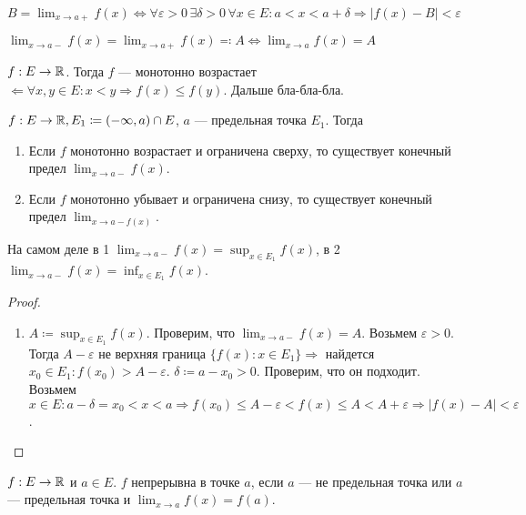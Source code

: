 \begin{remark}
    $B = \lim_{x \to a+} f(x) \iff \forall \varepsilon > 0 \, \exists \delta > 0 \, \forall x \in E: a < x < a + \delta \Rightarrow |f(x) - B| < \varepsilon$
\end{remark}
\begin{remark}
    $\lim_{x\to a-} f(x) = \lim_{x \to a+} f(x) \eqqcolon A \iff \lim_{x \to a} f(x) = A$
\end{remark}
\begin{definition}
    $f: E \to \mathbb{R}$. Тогда  $f$ --- монотонно возрастает $\Leftarrow \forall x, y \in E: x < y \Rightarrow f(x) \le f(y)$.
    Дальше бла-бла-бла.
\end{definition}
\begin{theorem}
    $f: E \to \mathbb{R}, E_1 \coloneqq (-\infty, a) \cap E$,  $a$ --- предельная точка  $E_1$. Тогда
     \begin{enumerate}
         \item Если $f$ монотонно возрастает и ограничена сверху, то существует конечный предел  $\lim_{x \to a-} f(x)$.
         \item Если $f$ монотонно убывает и ограничена снизу, то существует конечный предел  $\lim_{x \to a- f(x)}$.
    \end{enumerate}
\end{theorem}
\begin{remark}
    На самом деле в 1  $\lim_{x \to a-} f(x) = \sup_{x \in E_1} f(x)$, в  2  $\lim_{x \to a-} f(x) = \inf_{x \in E_1} f(x)$.
\end{remark}
\begin{proof}
    \slashn
    \begin{enumerate}
        \item $A \coloneqq \sup_{x \in E_1} f(x)$. Проверим, что  $\lim_{x \to a-} f(x) = A$. Возьмем  $\varepsilon > 0$. Тогда  $A - \varepsilon$ не верхняя граница $\{f(x): x \in E_1\} \Rightarrow$ найдется $x_0 \in E_1: f(x_0) > A - \varepsilon$. $\delta \coloneqq a - x_0 > 0$. Проверим, что он подходит. Возьмем  $x \in E: a - \delta = x_0 < x < a \Rightarrow f(x_0) \le A-\varepsilon < f(x) \le A < A + \varepsilon \Rightarrow |f(x) - A| < \varepsilon$.
    \end{enumerate}
\end{proof}
\begin{definition}
    $f: E \to \mathbb{R}$ и  $a \in E$.  $f$ непрерывна в точке  $a$, если  $a$ --- не предельная точка или  $a$ --- предельная точка и  $\lim_{x \to a} f(x) = f(a)$.
\end{definition}
